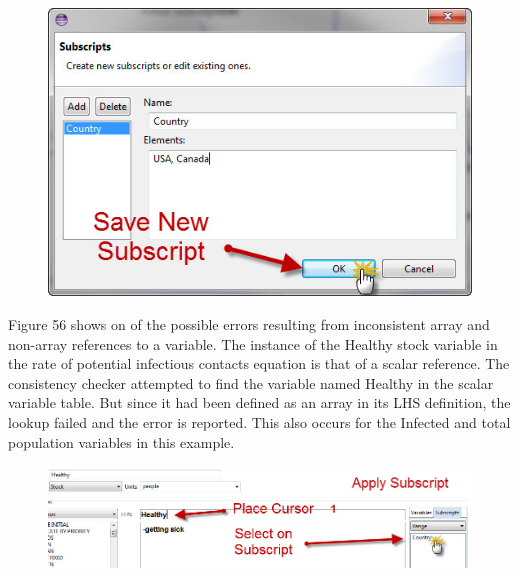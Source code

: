 \documentclass[11pt]{amsart}
\begin{document}
\begin{figure}[ht]
\begin{center}
\vspace{.2in}
\centerline {
\includegraphics[totalheight=0.3\textheight]{images/055.jpg}
}
\caption{}
\label{fig:055}
\end{center}
\end{figure}


Figure 56 shows on of the possible errors resulting from inconsistent array and non-array references to a variable. The instance of the Healthy stock variable in the rate of potential infectious contacts equation is that of a scalar reference. The consistency checker attempted to find the variable named Healthy in the scalar variable table. But since it had been defined as an array in its LHS definition, the lookup failed and the error is reported. This also occurs for the Infected and total population variables in this example.

\begin{figure}[ht]
\begin{center}
\vspace{.2in}
\centerline {
\includegraphics[totalheight=0.15\textheight]{images/056.jpg}
}
\caption{}
\label{fig:056}
\end{center}
\end{figure}
\end{document}
